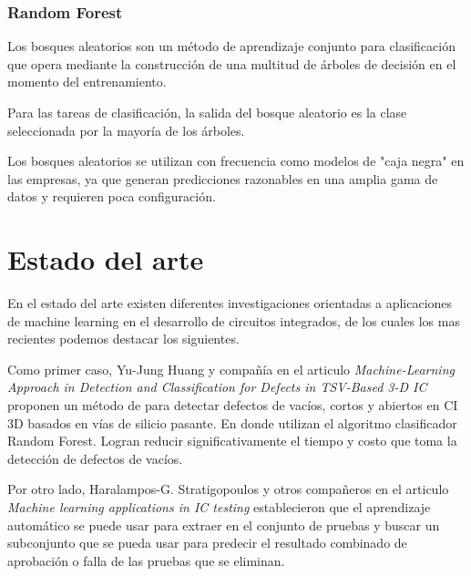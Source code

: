 \subsubsection{ Random Forest} \par

Los bosques aleatorios son un método de aprendizaje conjunto para clasificación que opera mediante la construcción de una multitud de árboles de decisión en el momento del entrenamiento.\par

Para las tareas de clasificación, la salida del bosque aleatorio es la clase seleccionada por la mayoría de los árboles.\par

Los bosques aleatorios se utilizan con frecuencia como modelos de "caja negra" en las empresas, ya que generan predicciones razonables en una amplia gama de datos y requieren poca configuración. \par


\section{Estado del arte}

En el estado del arte existen diferentes investigaciones orientadas a aplicaciones de machine learning en el desarrollo de circuitos integrados, de los cuales los mas recientes podemos destacar los siguientes. \par



Como primer caso, Yu-Jung Huang y compañía en el articulo \textit{Machine-Learning Approach in Detection and Classification for Defects in TSV-Based 3-D IC} proponen un método de para detectar defectos de vacíos, cortos y abiertos en CI  3D basados en vías de silicio pasante. En donde utilizan el algoritmo clasificador Random Forest. Logran reducir significativamente el tiempo y costo que toma la detección de defectos de vacíos.\par

Por otro lado, Haralampos-G. Stratigopoulos y otros compañeros en el articulo \textit{Machine learning applications in IC testing} establecieron que el aprendizaje automático se puede usar para extraer en el conjunto de pruebas y buscar un subconjunto que se pueda usar para predecir el resultado combinado de aprobación o falla de las pruebas que se eliminan.\par

